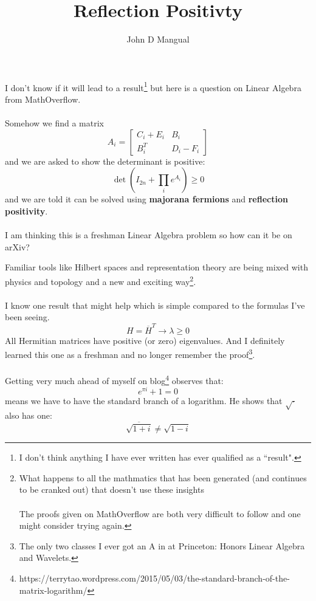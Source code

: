 \documentclass[12pt]{article}
\title{\textbf{ Reflection Positivty }}
\author{John D Mangual}
\date{}
\begin{document}
\selectfont \fontsize{25}{30}\selectfont

\maketitle

\noindent I don't know if it will lead to a result\footnote{I don't think anything I have ever written has ever qualified as a ``result".} but here is a question on Linear Algebra from MathOverflow.  \\ \\
Somehow we find a matrix
$$ A_i = \left[
\begin{array}{cc}
C_i + E_i & B_i \\
B_i^T & D_i - F_i
 \end{array}
\right] $$
and we are asked to show the determinant is positive:
$$ \det \left( I_{2n} + \prod_i e^{A_i} \right) \geq 0$$
and we are told it can be solved using \textbf{majorana fermions}  and \textbf{reflection positivity}. \\ \\
I am thinking this is a freshman Linear Algebra problem so how can it be on arXiv?

\newpage

\noindent Familiar tools like Hilbert spaces and representation theory are being mixed with physics and topology and a new and exciting way\footnote{
What happens to all the mathmatics that has been generated (and continues to be cranked out) that doesn't use these insights \\ \\
The proofs given on MathOverflow are both very difficult to follow and one might consider trying again.}. \\ \\
I know one result that might help which is simple compared to the formulas I've been seeing.
$$ H = \overline{H}^T \to \lambda \geq 0 $$
All Hermitian matrices have positive (or zero) eigenvalues.  And I definitely learned this one as a freshman and no longer remember the proof\footnote{The only two classes I ever got an A in at Princeton: Honors Linear Algebra and Wavelets.}. \\ \\
Getting very much ahead of myself on blog\footnote{https://terrytao.wordpress.com/2015/05/03/the-standard-branch-of-the-matrix-logarithm/} observes that:
$$ e^{\pi i} + 1 = 0 $$
means we have to have the standard branch of a logarithm.  He shows that $\sqrt{\cdot}$ also has one:
$$ \overline{\sqrt{1+i}} \neq \sqrt{1-i} $$
\newpage
\end{document}
